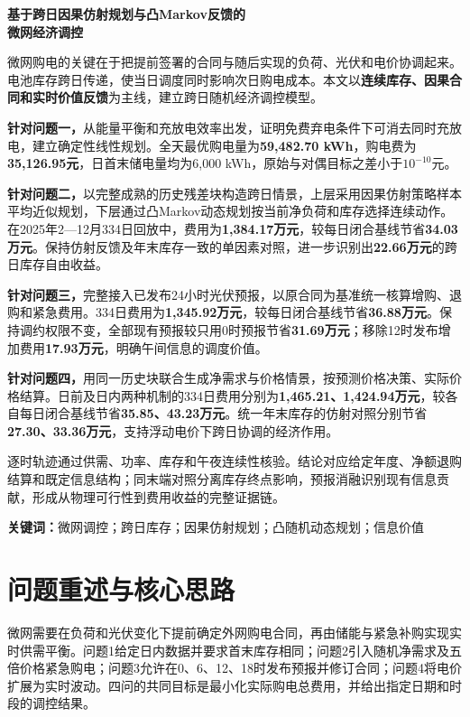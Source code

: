 \documentclass[UTF8,a4paper,zihao=-4,fontset=mac]{ctexart}
\begin{document}
\begin{center}{\bfseries 基于跨日因果仿射规划与凸Markov反馈的\\微网经济调控}\par\vspace{1em}{\large\bfseries 摘\quad 要}\end{center}
微网购电的关键在于把提前签署的合同与随后实现的负荷、光伏和电价协调起来。电池库存跨日传递，使当日调度同时影响次日购电成本。本文以\textbf{连续库存、因果合同和实时价值反馈}为主线，建立跨日随机经济调控模型。

\textbf{针对问题一，}从能量平衡和充放电效率出发，证明免费弃电条件下可消去同时充放电，建立确定性线性规划。全天最优购电量为\textbf{59,482.70 kWh}，购电费为\textbf{35,126.95元}，日首末储电量均为6,000 kWh，原始与对偶目标之差小于$10^{-10}$元。

\textbf{针对问题二，}以完整成熟的历史残差块构造跨日情景，上层采用因果仿射策略样本平均近似规划，下层通过凸Markov动态规划按当前净负荷和库存选择连续动作。在2025年2—12月334日回放中，费用为\textbf{1,384.17万元}，较每日闭合基线节省\textbf{34.03万元}。保持仿射反馈及年末库存一致的单因素对照，进一步识别出\textbf{22.66万元}的跨日库存自由收益。

\textbf{针对问题三，}完整接入已发布24小时光伏预报，以原合同为基准统一核算增购、退购和紧急费用。334日费用为\textbf{1,345.92万元}，较每日闭合基线节省\textbf{36.88万元}。保持调约权限不变，全部现有预报较只用0时预报节省\textbf{31.69万元}；移除12时发布增加费用\textbf{17.93万元}，明确午间信息的调度价值。

\textbf{针对问题四，}用同一历史块联合生成净需求与价格情景，按预测价格决策、实际价格结算。日前及日内两种机制的334日费用分别为\textbf{1,465.21、1,424.94万元}，较各自每日闭合基线节省\textbf{35.85、43.23万元}。统一年末库存的仿射对照分别节省\textbf{27.30、33.36万元}，支持浮动电价下跨日协调的经济作用。

逐时轨迹通过供需、功率、库存和午夜连续性核验。结论对应给定年度、净额退购结算和既定信息结构；同末端对照分离库存终点影响，预报消融识别现有信息贡献，形成从物理可行性到费用收益的完整证据链。

\vspace{.6em}\noindent\textbf{关键词：}微网调控；跨日库存；因果仿射规划；凸随机动态规划；信息价值
\clearpage
\section{问题重述与核心思路}
微网需要在负荷和光伏变化下提前确定外网购电合同，再由储能与紧急补购实现实时供需平衡。问题1给定日内数据并要求首末库存相同；问题2引入随机净需求及五倍价格紧急购电；问题3允许在0、6、12、18时发布预报并修订合同；问题4将电价扩展为实时波动。四问的共同目标是最小化实际购电总费用，并给出指定日期和时段的调控结果\cite{problem}。
\end{document}
